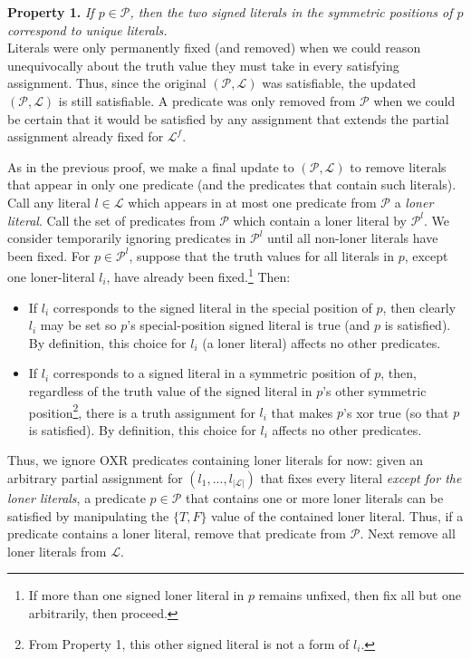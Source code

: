 \documentclass{article}
\begin{document}
\noindent \textbf{Property 1.} \textit{If $p\in \mathcal{P}$, then the two signed literals in the symmetric positions of $p$ correspond to unique literals.}\\

Literals were only permanently fixed (and removed) when we could reason unequivocally about the truth value they must take in every satisfying assignment. Thus, since the original $(\mathcal{P}, \mathcal{L})$ was satisfiable, the updated $(\mathcal{P}, \mathcal{L})$ is still satisfiable. A predicate was only removed from $\mathcal{P}$ when we could be certain that it would be satisfied by any assignment that extends the partial assignment already fixed for $\mathcal{L}^f$.
    
As in the previous proof, we make a final update to  $(\mathcal{P}, \mathcal{L})$ to remove literals that appear in only one predicate (and the predicates that contain such literals). Call any literal $l\in \mathcal{L}$ which appears in at most one predicate from $\mathcal{P}$ a \textit{loner literal}. Call the set of predicates from $\mathcal{P}$ which contain a loner literal by $\mathcal{P}^l$.  We consider temporarily ignoring predicates in $\mathcal{P}^l$ until all non-loner literals have been fixed. For $p\in \mathcal{P}^l$, suppose that the truth values for all literals in $p$, except one loner-literal $l_i$, have already been fixed.\footnote{If more than one signed loner literal in $p$ remains unfixed, then fix all but one arbitrarily, then proceed.} Then:
\begin{itemize}
\item If $l_i$ corresponds to the signed literal in the special position of $p$, then clearly $l_i$ may be set so $p$'s special-position signed literal is true (and $p$ is satisfied). By definition, this choice for $l_i$ (a loner literal) affects no other predicates.
\item If $l_i$ corresponds to a signed literal in a symmetric position of $p$, then, regardless of the truth value of the signed literal in $p$'s other symmetric position\footnote{From Property 1, this other signed literal is not a form of $l_i$.}, there is a truth assignment for $l_i$ that makes $p$'s xor true (so that $p$ is satisfied). By definition, this choice for $l_i$ affects no other predicates. 
\end{itemize}

Thus, we ignore OXR predicates containing loner literals for now: given an arbitrary partial assignment for $(l_1,...,l_{|\mathcal{L}|})$ that fixes every literal \textit{except for the loner literals}, a predicate  $p\in \mathcal{P}$ that contains one or more loner literals can be satisfied by manipulating the $\{T,F\}$ value of the contained loner literal. 
Thus, if a predicate contains a loner literal, remove that predicate from $\mathcal{P}$. Next remove all loner literals from $\mathcal{L}$. 
\end{document}
